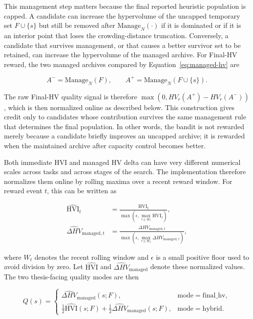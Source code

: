 \documentclass[../main.tex]{subfiles}
\begin{document}
This management step matters because the final reported heuristic population is capped. A candidate can increase the hypervolume of the uncapped temporary set $F\cup\{s\}$ but still be removed after $\mathrm{Manage}_N(\cdot)$ if it is dominated or if it is an interior point that loses the crowding-distance truncation. Conversely, a candidate that survives management, or that causes a better survivor set to be retained, can increase the hypervolume of the managed archive. For Final-HV reward, the two managed archives compared by Equation~\ref{eq:managed-hv} are

\begin{equation}
  A^-=\mathrm{Manage}_N(F),
  \qquad
  A^+=\mathrm{Manage}_N(F\cup\{s\}).
\end{equation}

The raw Final-HV quality signal is therefore $\max(0,HV_r(A^+)-HV_r(A^-))$, which is then normalized online as described below. This construction gives credit only to candidates whose contribution survives the same management rule that determines the final population. In other words, the bandit is not rewarded merely because a candidate briefly improves an uncapped archive; it is rewarded when the maintained archive after capacity control becomes better.

Both immediate HVI and managed HV delta can have very different numerical scales across tasks and across stages of the search. The implementation therefore normalizes them online by rolling maxima over a recent reward window. For reward event $t$, this can be written as

\begin{align}
  \widehat{\mathrm{HVI}}_t
  &=
  \frac{\mathrm{HVI}_t}
  {\max\left(\epsilon,\max_{\tau\in W_t}\mathrm{HVI}_\tau\right)},\\
  \widehat{\Delta HV}_{\mathrm{managed},t}
  &=
  \frac{\Delta HV_{\mathrm{managed},t}}
  {\max\left(\epsilon,\max_{\tau\in W_t}\Delta HV_{\mathrm{managed},\tau}\right)},
\end{align}

where $W_t$ denotes the recent rolling window and $\epsilon$ is a small positive floor used to avoid division by zero. Let $\widehat{\mathrm{HVI}}$ and $\widehat{\Delta HV}_{\mathrm{managed}}$ denote these normalized values. The two thesis-facing quality modes are then

\begin{equation}
  Q(s)=
  \begin{cases}
    \widehat{\Delta HV}_{\mathrm{managed}}(s;F),
    & \mathrm{mode}=\mathrm{final\_hv},\\
    \frac{1}{2}\widehat{\mathrm{HVI}}(s;F)
    +\frac{1}{2}\widehat{\Delta HV}_{\mathrm{managed}}(s;F),
    & \mathrm{mode}=\mathrm{hybrid}.
  \end{cases}
\end{equation}
\end{document}
